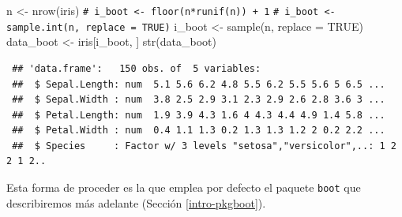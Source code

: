 \documentclass[
  10pt,
]{book}
\newenvironment{Shaded}{\begin{snugshade}}{\end{snugshade}}
\newcommand{\AttributeTok}[1]{\textcolor[rgb]{0.77,0.63,0.00}{#1}}
\newcommand{\CommentTok}[1]{\textcolor[rgb]{0.56,0.35,0.01}{\textit{#1}}}
\newcommand{\ConstantTok}[1]{\textcolor[rgb]{0.00,0.00,0.00}{#1}}
\newcommand{\FunctionTok}[1]{\textcolor[rgb]{0.00,0.00,0.00}{#1}}
\newcommand{\NormalTok}[1]{#1}
\newcommand{\OtherTok}[1]{\textcolor[rgb]{0.56,0.35,0.01}{#1}}
\theoremstyle{break}
\theoremstyle{nonumberplain}
\renewcommand{\CommentTok}[1]{\textcolor[rgb]{0.41,0.41,0.41}{\texttt{#1}}}
\begin{document}
\begin{Shaded}
\begin{Highlighting}[]
\NormalTok{n }\OtherTok{\textless{}{-}} \FunctionTok{nrow}\NormalTok{(iris)}
\CommentTok{\# i\_boot \textless{}{-} floor(n*runif(n)) + 1}
\CommentTok{\# i\_boot \textless{}{-} sample.int(n, replace = TRUE)}
\NormalTok{i\_boot }\OtherTok{\textless{}{-}} \FunctionTok{sample}\NormalTok{(n, }\AttributeTok{replace =} \ConstantTok{TRUE}\NormalTok{)}
\NormalTok{data\_boot }\OtherTok{\textless{}{-}}\NormalTok{ iris[i\_boot, ]}
\FunctionTok{str}\NormalTok{(data\_boot)}
\end{Highlighting}
\end{Shaded}

\begin{verbatim}
 ## 'data.frame':   150 obs. of  5 variables:
 ##  $ Sepal.Length: num  5.1 5.6 6.2 4.8 5.5 6.2 5.5 5.6 5 6.5 ...
 ##  $ Sepal.Width : num  3.8 2.5 2.9 3.1 2.3 2.9 2.6 2.8 3.6 3 ...
 ##  $ Petal.Length: num  1.9 3.9 4.3 1.6 4 4.3 4.4 4.9 1.4 5.8 ...
 ##  $ Petal.Width : num  0.4 1.1 1.3 0.2 1.3 1.3 1.2 2 0.2 2.2 ...
 ##  $ Species     : Factor w/ 3 levels "setosa","versicolor",..: 1 2 2 1 2..
\end{verbatim}

Esta forma de proceder es la que emplea por defecto el paquete \texttt{boot} que describiremos más adelante (Sección \ref{intro-pkgboot}).
\end{document}
